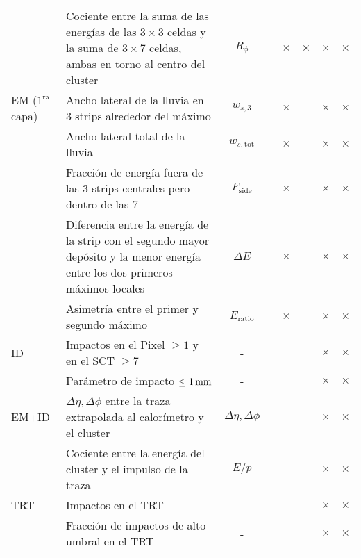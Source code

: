 \begin{table}[!htbp]
\begin{tabular}{l p{7cm} c | cc | ccc}
                 & Cociente entre la suma de las energías de las
                   $3\times 3$ celdas y la suma de $3\times 7$
                   celdas, ambas en torno al centro del cluster     & $R_\phi$                &   & $\times$ & $\times$ & $\times$ & $\times$ \\


  EM ($1^\mathrm{ra}$ capa) & Ancho lateral de la lluvia en 3 strips alrededor
                  del máximo                                        & $w_{s,3}$               &   & $\times$ &   & $\times$ & $\times$ \\

                & Ancho lateral total de la lluvia                  & $w_{s,\mathrm{tot}}$    &   & $\times$ &   & $\times$ & $\times$ \\

                & Fracción de energía fuera de las 3 strips
                  centrales pero dentro de las 7                    & $F_{\mathrm{side}}$     &   & $\times$ &   & $\times$ & $\times$ \\

                & Diferencia entre la energía de la strip con el
                  segundo mayor depósito y la menor energía entre
                  los dos primeros máximos locales                  & $\Delta E$              &   & $\times$ &   & $\times$ & $\times$ \\

                & Asimetría entre el primer y segundo máximo        & $E_{\mathrm{ratio}}$    &   & $\times$ &   & $\times$ & $\times$ \\


  ID            & Impactos en el Pixel $\geq 1$ y en el
                  SCT $\geq 7$                                      & -                       &   &   &   & $\times$ & $\times$ \\

                & Parámetro de impacto $\leq \unit[1]{mm}$          & -                       &   &   &   & $\times$ & $\times$ \\


  EM+ID         & $\Delta\eta,\Delta\phi$ entre la traza
                  extrapolada al calorímetro y el cluster           & $\Delta\eta,\Delta\phi$ &  &   &   & $\times$ & $\times$ \\

                & Cociente entre la energía del cluster y el impulso
                  de la traza                                       & $E/p$                   &  &   &   & $\times$ & $\times$ \\


  TRT           & Impactos en el TRT                                & -                       &  &   &   & $\times$ & $\times$ \\

                & Fracción de impactos de alto umbral en el TRT     & -                       &  &   &   & $\times$ & $\times$ \\
  \hline
  \end{tabular}

\end{table}
